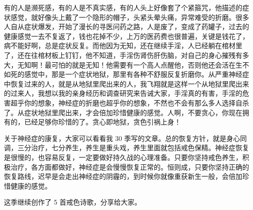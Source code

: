 有的人是濒死感，有的人是不真实感，有的人头上好像套了个紧箍咒，他描述的症状感觉，就好像头上戴了一个隐形的帽子，头紧头晕头痛，异常难受的折磨。很多人自从症状爆发，开始了漫长的寻医问药之路，人是废了，变成了药罐子，过去的健康感觉一去不复返了，钱也花掉不少，上万的医药费也很普遍，关键是钱花了，病不能好啊，总是症状反复。而他因为无知，还在继续手淫，人已经躺在棺材里了，还在往棺材板上钉钉，他不知道，手淫伤肾伤肝伤脑，对自己的身心摧残有多大，无知啊！最可怕的就是无知！他需要有一个高人点醒他，否则他还会活在生不如死的感觉中，那是一个症状地狱，那里有各种不舒服反复折磨你。从严重神经症中恢复过来的人，就是从地狱里爬出来的人，我飞翔就是这样一个从地狱里爬出来的过来人，我想以我的亲身经历和调查研究来告诫大家，手淫真的有害，手淫的危害超乎你的想象，神经症的折磨也超乎你的想象，不然也不会有那么多人选择自杀了。从症状地狱里爬出来，才会倍加珍惜健康的感觉。人啊，不要贪心，你现在拥有的，已经足够你珍惜的了。贪心即地狱，贪色引祸上身！

关于神经症的康复，大家可以看看我 30 季写的文章。总的恢复方针，就是身心同调，三分治疗，七分养生，养生是重头戏，养生里面就包括戒色保精。神经症恢复是很慢的，也容易反复，一定要做好持久战的心理准备。只要你坚持戒色养生，积极治疗，各方面都做好，神经症是会慢慢恢复正常的。恒则成，只要你坚持正确的恢复路线，迟早是会走出神经症的阴霾的，到时候你就像重获新生一般，会倍加珍惜健康的感觉。

这季继续创作了 5 首戒色诗歌，分享给大家。

